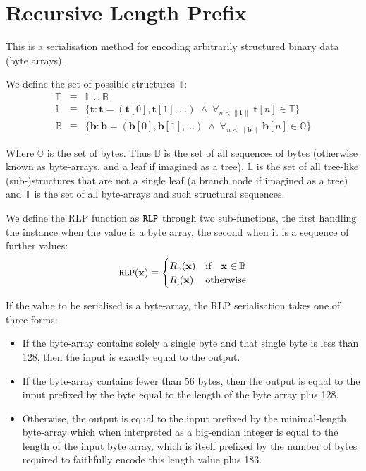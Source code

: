 \documentclass[9pt,oneside]{amsart}
\makeatletter
\newcommand{\linkdest}[1]{\Hy@raisedlink{\hypertarget{#1}{}}}
\makeatother
\begin{document}
\section{Recursive Length Prefix}\label{app:rlp}\hypertarget{rlp}{}
This is a serialisation method for encoding arbitrarily structured binary data (byte arrays).

We define the set of possible structures $\mathbb{T}$:
\begin{eqnarray}
\mathbb{T} & \equiv & \mathbb{L} \cup \mathbb{B} \\
\mathbb{L} & \equiv & \{ \mathbf{t}: \mathbf{t} = ( \mathbf{t}[0], \mathbf{t}[1], ... ) \; \wedge \; \forall_{n < \lVert \mathbf{t} \rVert} \; \mathbf{t}[n] \in \mathbb{T} \} \\
\mathbb{B} & \equiv & \{ \mathbf{b}: \mathbf{b} = ( \mathbf{b}[0], \mathbf{b}[1], ... ) \; \wedge \; \forall_{n < \lVert \mathbf{b} \rVert} \; \mathbf{b}[n] \in \mathbb{O} \}
\end{eqnarray}

Where $\mathbb{O}$ is the set of bytes. Thus $\mathbb{B}$ is the set of all sequences of bytes (otherwise known as byte-arrays, and a leaf if imagined as a tree), $\mathbb{L}$ is the set of all tree-like (sub-)structures that are not a single leaf (a branch node if imagined as a tree) and $\mathbb{T}$ is the set of all byte-arrays and such structural sequences.

We define the RLP function as $\mathtt{\tiny RLP}$ through two sub-functions, the first handling the instance when the value is a byte array, the second when it is a sequence of further values:
\begin{equation}
\mathtt{\tiny RLP}(\mathbf{x}) \equiv \begin{cases} R_{\mathrm{b}}(\mathbf{x}) & \text{if} \quad \mathbf{x} \in \mathbb{B} \\ R_{\mathrm{l}}(\mathbf{x}) & \text{otherwise} \end{cases}
\end{equation}

\hypertarget{RLP_serialisation_of_a_byte_array_R__b_word_def}{}\linkdest{R__b}If the value to be serialised is a byte-array, the RLP serialisation takes one of three forms:

\begin{itemize}
\item If the byte-array contains solely a single byte and that single byte is less than 128, then the input is exactly equal to the output.
\item If the byte-array contains fewer than 56 bytes, then the output is equal to the input prefixed by the byte equal to the length of the byte array plus 128.
\item Otherwise, the output is equal to the input prefixed by the minimal-length byte-array which when interpreted as a big-endian integer is equal to the length of the input byte array, which is itself prefixed by the number of bytes required to faithfully encode this length value plus 183.
\end{itemize}
\end{document}
